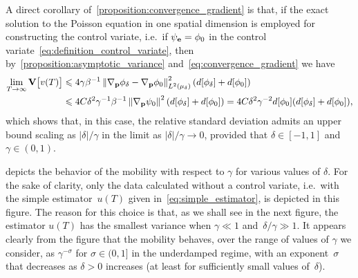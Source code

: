 \documentclass[11pt,a4paper]{article}
\begin{document}
A direct corollary of~\cref{proposition:convergence_gradient} is that,
if the exact solution to the Poisson equation in one spatial dimension is employed for constructing the control variate,
i.e.\ if $\psi_{\boldsymbol{\mathbf e}} = \phi_0$ in the control variate~\eqref{eq:definition_control_variate},
then by~\cref{proposition:asymptotic_variance} and~\eqref{eq:convergence_gradient}
we have
\begin{align*}
    \lim_{T \to \infty} \var \bigl[v(T)\bigr]
    &\leq 4 \gamma \beta^{-1} \norm{\grad_{\vect p} \phi_{\delta} - \grad_{\vect p} \phi_0}[L^2(\mu_{\delta})]^2 (d[\phi_{\delta}] + d[\phi_0]) \\
    &\leq 4 C \delta^2 \gamma^{-1} \beta^{-1} \norm{\grad_{\vect p} \psi_{0}}^2 (d[\phi_{\delta}] + d[\phi_0])
    = 4 C \delta^2 \gamma^{-2} d[\phi_{0}] (d[\phi_{\delta}] + d[\phi_0]),
\end{align*}
which shows that, in this case,
the relative standard deviation admits an upper bound scaling as $\lvert \delta \rvert / \gamma$
in the limit as $\lvert \delta \rvert/\gamma \to 0$,
provided that $\delta \in [-1, 1]$ and $\gamma \in (0, 1)$.

 depicts the behavior of the mobility with respect to $\gamma$ for various values of $\delta$.
For the sake of clarity,
only the data calculated without a control variate,
i.e.\ with the simple estimator~$u(T)$ given in~\eqref{eq:simple_estimator},
is depicted in this figure.
The reason for this choice is that,
as we shall see in the next figure,
the estimator $u(T)$ has the smallest variance when $\gamma \ll 1$ and~$\delta/\gamma \gg 1$.
It appears clearly from the figure that the mobility behaves,
over the range of values of $\gamma$ we consider,
as $\gamma^{-\sigma}$ for $\sigma \in (0, 1]$ in the underdamped regime,
with an exponent~$\sigma$ that decreases as $\delta > 0$ increases (at least for sufficiently small values of~$\delta$).
\end{document}
